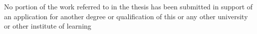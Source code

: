 No portion of the work referred to in the thesis has been
submitted in support of an application for another degree or
qualification of this or any other university or other institute of
learning

